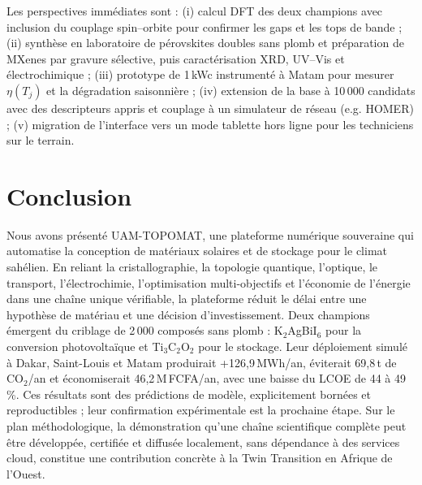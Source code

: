 \documentclass[11pt,a4paper,french]{article}
\newcommand{\TOPOMAT}{UAM-TOPOMAT}
\begin{document}
Les perspectives immédiates sont : (i) calcul DFT des deux champions avec inclusion du couplage spin--orbite pour confirmer les gaps et les tops de bande ; (ii) synthèse en laboratoire de pérovskites doubles sans plomb et préparation de MXenes par gravure sélective, puis caractérisation XRD, UV--Vis et électrochimique ; (iii) prototype de 1\,kWc instrumenté à Matam pour mesurer $\eta(T_j)$ et la dégradation saisonnière ; (iv) extension de la base à 10\,000 candidats avec des descripteurs appris et couplage à un simulateur de réseau (e.g. HOMER) ; (v) migration de l'interface vers un mode tablette hors ligne pour les techniciens sur le terrain.

\section{Conclusion}
\label{sec:conclusion}

Nous avons présenté \TOPOMAT{}, une plateforme numérique souveraine qui automatise la conception de matériaux solaires et de stockage pour le climat sahélien. En reliant la cristallographie, la topologie quantique, l'optique, le transport, l'électrochimie, l'optimisation multi-objectifs et l'économie de l'énergie dans une chaîne unique vérifiable, la plateforme réduit le délai entre une hypothèse de matériau et une décision d'investissement. Deux champions émergent du criblage de 2\,000 composés sans plomb : K$_2$AgBiI$_6$ pour la conversion photovoltaïque et Ti$_3$C$_2$O$_2$ pour le stockage. Leur déploiement simulé à Dakar, Saint-Louis et Matam produirait +126,9\,MWh/an, éviterait 69,8\,t de CO$_2$/an et économiserait 46,2\,M\,FCFA/an, avec une baisse du LCOE de 44 à 49\,\%. Ces résultats sont des prédictions de modèle, explicitement bornées et reproductibles ; leur confirmation expérimentale est la prochaine étape. Sur le plan méthodologique, la démonstration qu'une chaîne scientifique complète peut être développée, certifiée et diffusée localement, sans dépendance à des services cloud, constitue une contribution concrète à la Twin Transition en Afrique de l'Ouest.

\end{document}
